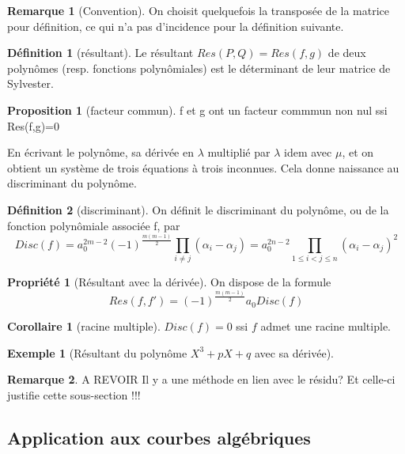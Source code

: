 \documentclass{article}
\theoremstyle{definition} %
\newtheorem{defi}{Définition}
\newtheorem{rmq}{Remarque}
\newtheorem{prop}{Proposition}
\newtheorem{ex}{Exemple}
\newtheorem{propri}{Propriété}
\newtheorem{cor}{Corollaire}
\newcommand{\1}{\mathbb{1}} %
\begin{document}
\begin{rmq}[Convention]
On choisit quelquefois la transposée de la matrice pour définition, ce qui n'a pas d'incidence pour la définition suivante.
\end{rmq}

\begin{defi}[résultant]
Le résultant $Res(P,Q)=Res(f,g)$ de deux polynômes (resp. fonctions polynômiales) est le déterminant de leur matrice de Sylvester.
\end{defi}

\begin{prop}[facteur commun]
f et g ont un facteur commmun non nul ssi Res(f,g)=0
\end{prop}


En écrivant le polynôme, sa dérivée en $\lambda$ multiplié par $\lambda$ idem avec $\mu$, et on obtient un système de trois équations à trois inconnues.
Cela donne naissance au discriminant du polynôme.

\begin{defi}[discriminant]

On définit le discriminant du polynôme, ou de la fonction polynômiale associée f, par
$$Disc(f)=a_0^{2m-2} (-1)^{\frac{m(m-1)}{2}} \prod_{i \neq j} (\alpha_i - \alpha_j) = a_0^{2n-2} \prod_{1 \leq i < j \leq n} (\alpha_i - \alpha_j)^2$$
\end{defi}

\begin{propri}[Résultant avec la dérivée]
On dispose de la formule
$$Res(f,f')=(-1)^{\frac{m(m-1)}{2}} a_0 Disc(f)$$
\end{propri}

\begin{cor}[racine multiple]
$Disc(f)=0$ ssi $f$ admet une racine multiple.
\end{cor}

\begin{ex}[Résultant du polynôme $X^3 + pX + q$ avec sa dérivée]

\end{ex}

\begin{rmq}
A REVOIR Il y a une méthode en lien avec le résidu?
Et celle-ci justifie cette sous-section !!!
\end{rmq}

\subsection{Application aux courbes algébriques}
\end{document}
